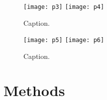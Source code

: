 {}\begin{figure}[ht] \hspace*{0cm} \begin{center} \texttt{[image: p3]} \texttt{[image: p4]} \caption{Caption.} \label{fig:p3p4} \end{center} \end{figure}\markdownRendererInterblockSeparator
{}\begin{figure}[ht] \hspace*{0cm} \begin{center} \texttt{[image: p5]} \texttt{[image: p6]} \caption{Caption.} \label{fig:p5p6} \end{center} \end{figure}\markdownRendererInterblockSeparator
{}\section{Methods}\relax